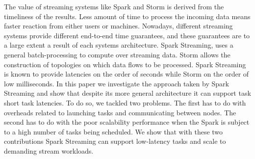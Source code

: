\noindent The value of streaming systems like Spark and Storm is derived from the timeliness of the results. Less amount of time to process the incoming data means faster reaction from either users or machines. Nowadays, different streaming systems provide different end-to-end time guarantees, and these guarantees are to a large extent a result of each systems architecture. Spark Streaming, uses a general batch-processing to compute over streaming data. Storm allows the construction of topologies on which data flows to be processed. Spark Streaming is known to provide latencies on the order of seconds while Storm on the order of low milliseconds. In this paper we investigate the approach taken by Spark Streaming and show that despite its more general architecture it can support task short task latencies. To do so, we tackled two problems. The first has to do with overheads related to launching tasks and communicating between nodes. The second has to do with the poor scalability performance when the Spark is subject to a high number of tasks being scheduled. We show that with these two contributions Spark Streaming can support low-latency tasks and scale to demanding stream workloads.


